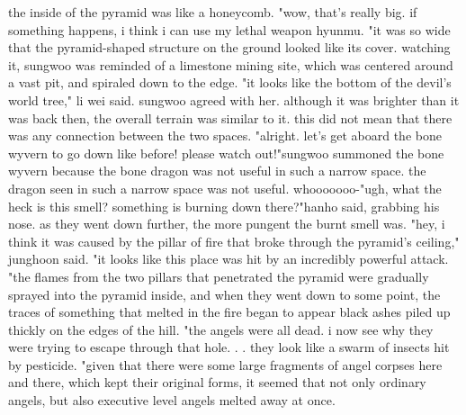 the inside of the pyramid was like a honeycomb.
"wow, that's really big.
 if something happens, i think i can use my lethal weapon hyunmu.
"it was so wide that the pyramid-shaped structure on the ground looked like its cover.
watching it, sungwoo was reminded of a limestone mining site, which was centered around a vast pit, and spiraled down to the edge.
"it looks like the bottom of the devil's world tree," li wei said.
 sungwoo agreed with her.
 although it was brighter than it was back then, the overall terrain was similar to it.
 this did not mean that there was any connection between the two spaces.
"alright.
 let's get aboard the bone wyvern to go down like before! please watch out!"sungwoo summoned the bone wyvern because the bone dragon was not useful in such a narrow space.
the dragon seen in such a narrow space was not useful.
whooooooo-"ugh, what the heck is this smell? something is burning down there?"hanho said, grabbing his nose.
 as they went down further, the more pungent the burnt smell was.
"hey, i think it was caused by the pillar of fire that broke through the pyramid's ceiling," junghoon said.
 "it looks like this place was hit by an incredibly powerful attack.
"the flames from the two pillars that penetrated the pyramid were gradually sprayed into the pyramid inside, and when they went down to some point, the traces of something that melted in the fire began to appear black ashes piled up thickly on the edges of the hill.
"the angels were all dead.
 i now see why they were trying to escape through that hole.
.
.
 they look like a swarm of insects hit by pesticide.
"given that there were some large fragments of angel corpses here and there, which kept their original forms, it seemed that not only ordinary angels, but also executive level angels melted away at once.

